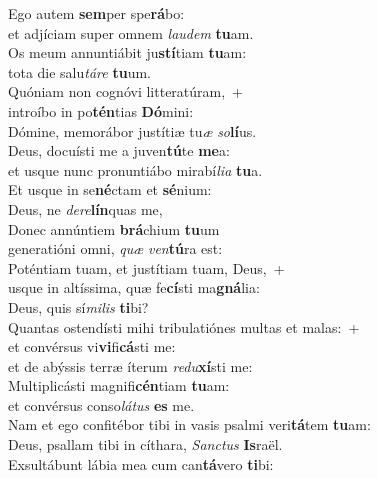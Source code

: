 \evenverse Ego autem \textbf{sem}per spe\textbf{rá}bo:~\*\\
\evenverse et adjíciam super omnem \textit{lau}\textit{dem} \textbf{tu}am.\\
\oddverse Os meum annuntiábit ju\textbf{stí}tiam \textbf{tu}am:~\*\\
\oddverse tota die salu\textit{tá}\textit{re} \textbf{tu}um.\\
\evenverse Quóniam non cognóvi litteratúram,~+\\
\evenverse  introíbo in po\textbf{tén}tias \textbf{Dó}mini:~\*\\
\evenverse Dómine, memorábor justítiæ tu\textit{æ} \textit{so}\textbf{lí}us.\\
\oddverse Deus, docuísti me a juven\textbf{tú}te \textbf{me}a:~\*\\
\oddverse et usque nunc pronuntiábo mirabí\textit{li}\textit{a} \textbf{tu}a.\\
\evenverse Et usque in se\textbf{né}ctam et \textbf{sé}nium:~\*\\
\evenverse Deus, ne \textit{de}\textit{re}\textbf{lín}quas me,\\
\oddverse Donec annúntiem \textbf{brá}chium \textbf{tu}um~\*\\
\oddverse generatióni omni, \textit{quæ} \textit{ven}\textbf{tú}ra est:\\
\evenverse Poténtiam tuam, et justítiam tuam, Deus,~+\\
\evenverse  usque in altíssima, quæ fe\textbf{cí}sti ma\textbf{gná}lia:~\*\\
\evenverse Deus, quis sí\textit{mi}\textit{lis} \textbf{ti}bi?\\
\oddverse Quantas ostendísti mihi tribulatiónes multas et malas:~+\\
\oddverse  et convérsus vi\textbf{vi}fi\textbf{cá}sti me:~\*\\
\oddverse et de abýssis terræ íterum \textit{re}\textit{du}\textbf{xí}sti me:\\
\evenverse Multiplicásti magnifi\textbf{cén}tiam \textbf{tu}am:~\*\\
\evenverse et convérsus conso\textit{lá}\textit{tus} \textbf{es} me.\\
\oddverse Nam et ego confitébor tibi in vasis psalmi veri\textbf{tá}tem \textbf{tu}am:~\*\\
\oddverse Deus, psallam tibi in cíthara, \textit{San}\textit{ctus} \textbf{Is}raël.\\
\evenverse Exsultábunt lábia mea cum can\textbf{tá}vero \textbf{ti}bi:~\*\\
